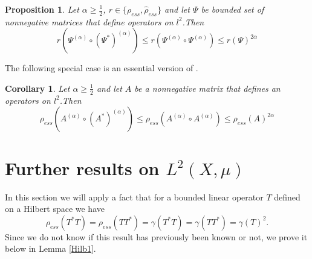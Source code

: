 \documentclass[12pt, reqno]{amsart}
\newtheorem{proposition}[theorem]{Proposition}
\newtheorem{corollary}[theorem]{Corollary}
\theoremstyle{definition}
\theoremstyle{remark}
\numberwithin{equation}{section}
\newcommand{\be}{\begin{equation}}
\newcommand{\ee}{\end{equation}}
\begin{document}
\begin{proposition}
\label{dog}
Let $\alpha\ge\frac{1}{2}$, $r\in \{ \rho _{ess}, \hat{\rho} _{ess}\}$ and let $\Psi$ be bounded set of nonnegative matrices that define operators on $l^2$.Then
\be
r(\Psi^{(\alpha)}\circ(\Psi^*)^{(\alpha)})\le r(\Psi^{(\alpha)}\circ\Psi^{(\alpha)})\le r(\Psi)^{2\alpha}
\label{hund}
\ee
\end{proposition}
The following special case is an essential version of \cite[Lemma 3.13]{BP21}.
\begin{corollary}
\label{dog_cor}
Let $\alpha\ge\frac{1}{2}$ and  %
let $A$ be a nonnegative matrix that defines an operators on $l^2$.Then
\be
\rho _{ess}(A^{(\alpha)}\circ(A^*)^{(\alpha)})\le \rho _{ess}(A^{(\alpha)}\circ A^{(\alpha)})\le \rho _{ess}(A)^{2\alpha}
\label{hund_cor}
\ee
\end{corollary}
\bigskip

\section{Further results on $L^2(X,\mu)$}

In this section we will apply a fact that for a bounded linear operator $T$  defined on a Hilbert space we have
\begin{equation}
\rho_{ess}(T^* T) = \rho_{ess}(TT^*)=\gamma (T^* T) = \gamma (TT^*)=  \gamma(T)^2.
\label{Hilbert}
\end{equation}
Since we do not know if this result has previously been known or not, we prove it below in Lemma \ref{Hilb1}.
\end{document}
